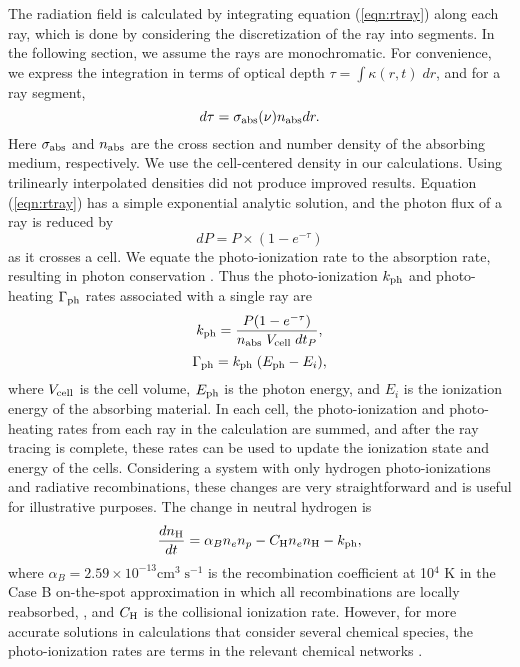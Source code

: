 \documentclass[useAMS,usenatbib,a4paper]{mn2e}
\begin{document}
The radiation field is calculated by integrating equation
(\ref{eqn:rtray}) along each ray, which is done by considering the
discretization of the ray into segments.  In the following section, we
assume the rays are monochromatic.  For convenience, we express the
integration in terms of optical depth $\tau = \int \kappa(r,t) \; dr$,
and for a ray segment,
%
\begin{equation}
  \label{eqn:dtau}
  d\tau = \sigma_{\rm abs}(\nu) n_{\rm abs} dr.
\end{equation}
Here $\sigma_{\rm abs}$ and $n_{\rm abs}$ are the cross section and
number density of the absorbing medium, respectively.  We use the
cell-centered density in our calculations.  Using trilinearly
interpolated densities \citep[see][]{Mellema06} did not produce
improved results.  Equation (\ref{eqn:rtray}) has a simple exponential
analytic solution, and the photon flux of a ray is reduced by
%
\begin{equation}
  \label{eqn:flux}
  dP = P \times (1 - e^{-\tau})
\end{equation}
as it crosses a cell.  We equate the photo-ionization rate to the
absorption rate, resulting in photon conservation \citep{Abel99_RT,
  Mellema06}.  Thus the photo-ionization $k_{\rm ph}$ and
photo-heating $\Gamma_{\rm ph}$ rates associated with a single ray are
%
\begin{equation}
  \label{eqn:kph}
  k_{\rm ph} = \frac{P (1 - e^{-\tau})}{n_{\rm abs} \; V_{\rm cell} \; dt_P},
\end{equation}
\begin{equation}
  \label{eqn:gamma}
  \Gamma_{\rm ph} = k_{\rm ph} \; (E_{\rm ph} - E_i),
\end{equation}
where $V_{\rm cell}$ is the cell volume, $E_{\rm ph}$ is the photon
energy, and $E_i$ is the ionization energy of the absorbing material.
In each cell, the photo-ionization and photo-heating rates from each
ray in the calculation are summed, and after the ray tracing is
complete, these rates can be used to update the ionization state and
energy of the cells.  Considering a system with only hydrogen
photo-ionizations and radiative recombinations, these changes are very
straightforward and is useful for illustrative purposes.  The change
in neutral hydrogen is
%
\begin{equation}
\frac{dn_{\rm H}}{dt} = \alpha_B n_e n_p - C_{\rm H} n_e n_{\rm
  H} - k_{\rm ph},
\end{equation}
where $\alpha_B = 2.59 \times 10^{-13} \mathrm{cm}^3 \;
\mathrm{s}^{-1}$ is the recombination coefficient at 10$^4$ K in the
Case B on-the-spot approximation in which all recombinations are
locally reabsorbed, \citep{Spitzer78}, and $C_{\rm H}$ is the
collisional ionization rate.  However, for more accurate solutions in
calculations that consider several chemical species, the
photo-ionization rates are terms in the relevant chemical networks
\citep[e.g.][]{Abel97}.
\end{document}
